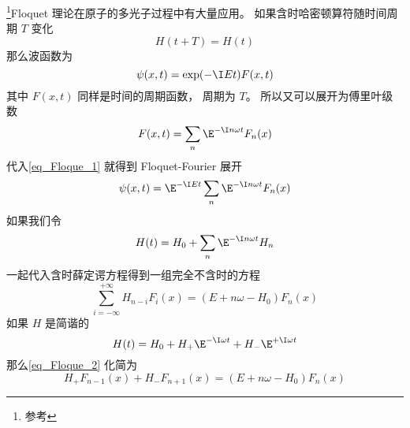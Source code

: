 

\footnote{参考\cite{Bransden}}Floquet 理论在原子的多光子过程中有大量应用。 如果含时哈密顿算符随时间周期 $T$ 变化
\begin{equation}
H(t+T) = H(t)
\end{equation}
那么波函数为
\begin{equation}\label{eq_Floque_1}
\psi(x, t) = \exp(-\I Et) F(x, t)
\end{equation}
其中 $F(x, t)$ 同样是时间的周期函数， 周期为 $T$。 所以又可以展开为傅里叶级数
\begin{equation}
F(x, t) = \sum_{n} \E^{-\I n\omega t} F_n(x)
\end{equation}
代入\autoref{eq_Floque_1} 就得到 Floquet-Fourier 展开
\begin{equation}
\psi(x, t) = \E^{-\I Et} \sum_{n} \E^{-\I n\omega t} F_n(x)
\end{equation}
如果我们令
\begin{equation}
H(t) = H_0 + \sum_{n} \E^{-\I n\omega t} H_n
\end{equation}
一起代入含时薛定谔方程得到一组完全不含时的方程
\begin{equation}\label{eq_Floque_2}
\sum_{i=-\infty}^{+\infty} H_{n-i} F_i(x) = (E + n\omega - H_0) F_n(x)
\end{equation}
如果 $H$ 是简谐的
\begin{equation}
H(t) = H_0 + H_+\E^{-\I\omega t} + H_-\E^{+\I\omega t}
\end{equation}
那么\autoref{eq_Floque_2} 化简为
\begin{equation}
H_{+} F_{n-1}(x) + H_{-} F_{n+1}(x) = (E + n\omega - H_0) F_n(x)
\end{equation}
